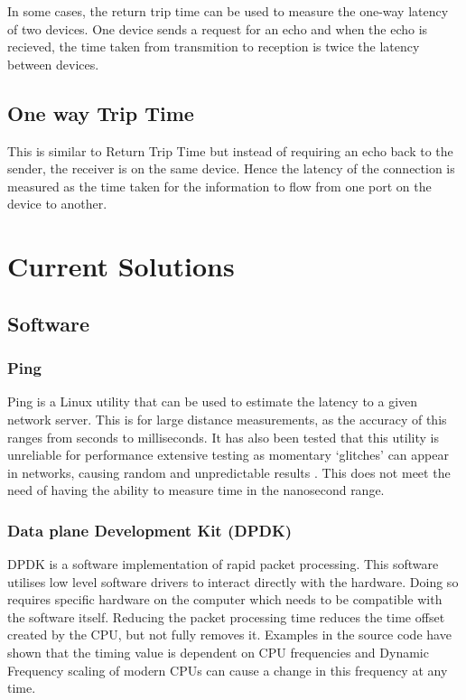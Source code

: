 In some cases, the return trip time can be used to measure the one-way latency of two devices. One
device sends a request for an echo and when the echo is recieved, the time taken from transmition to reception is
twice the latency between devices.

\subsection{One way Trip Time}

This is similar to Return Trip Time but instead of requiring an echo back to the sender, the receiver is on the
same device. Hence the latency of the connection is measured as the time taken for the information
to flow from one port on the device to another.

\section{Current Solutions}

\subsection{Software}

\subsubsection{Ping}

Ping is a Linux utility that can be used to estimate the latency to a given network server. 
This is for large distance measurements, as the accuracy of this ranges from seconds to milliseconds. 
It has also been tested that this utility is unreliable for performance extensive testing as momentary ‘glitches’ can appear in networks, causing random and unpredictable results \cite{pingisbad}.
This does not meet the need of having the ability to measure time in the nanosecond range.

\subsubsection{Data plane Development Kit (DPDK)}

DPDK is a software implementation of rapid packet processing. 
This software utilises low level software drivers to interact directly with the hardware. 
Doing so requires specific hardware on the computer which needs to be compatible with the software itself.
Reducing the packet processing time reduces the time offset created by the CPU, but not fully removes it. 
Examples in the source code have shown that the timing value is dependent on CPU frequencies \cite{dpdkcode} and Dynamic Frequency scaling \cite{turboboost} of modern CPUs can cause a change in this frequency at any time.

